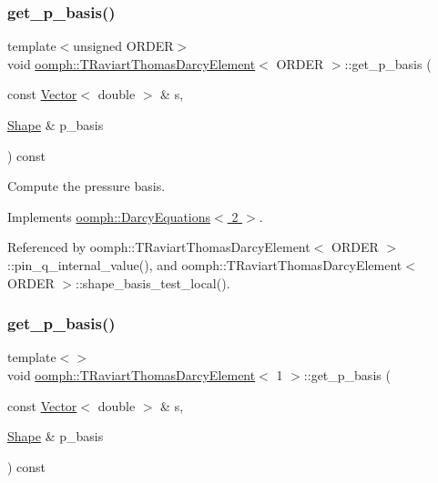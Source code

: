 \subsubsection{\texorpdfstring{get\+\_\+p\+\_\+basis()}{get\_p\_basis()}\hspace{0.1cm}{\footnotesize\ttfamily [2/3]}}
{\footnotesize\ttfamily template$<$unsigned O\+R\+D\+ER$>$ \\
void \hyperlink{classoomph_1_1TRaviartThomasDarcyElement}{oomph\+::\+T\+Raviart\+Thomas\+Darcy\+Element}$<$ O\+R\+D\+ER $>$\+::get\+\_\+p\+\_\+basis (\begin{DoxyParamCaption}\item[{const \hyperlink{classoomph_1_1Vector}{Vector}$<$ double $>$ \&}]{s,  }\item[{\hyperlink{classoomph_1_1Shape}{Shape} \&}]{p\+\_\+basis }\end{DoxyParamCaption}) const\hspace{0.3cm}{\ttfamily [virtual]}}



Compute the pressure basis. 



Implements \hyperlink{classoomph_1_1DarcyEquations_ab413b560166194e4a9d1b7de4742c5c0}{oomph\+::\+Darcy\+Equations$<$ 2 $>$}.



Referenced by oomph\+::\+T\+Raviart\+Thomas\+Darcy\+Element$<$ O\+R\+D\+E\+R $>$\+::pin\+\_\+q\+\_\+internal\+\_\+value(), and oomph\+::\+T\+Raviart\+Thomas\+Darcy\+Element$<$ O\+R\+D\+E\+R $>$\+::shape\+\_\+basis\+\_\+test\+\_\+local().

\mbox{\label{classoomph_1_1TRaviartThomasDarcyElement_a745f700fb01e94a3ccfb75faeb2f22c2}} 
\subsubsection{\texorpdfstring{get\+\_\+p\+\_\+basis()}{get\_p\_basis()}\hspace{0.1cm}{\footnotesize\ttfamily [3/3]}}
{\footnotesize\ttfamily template$<$$>$ \\
void \hyperlink{classoomph_1_1TRaviartThomasDarcyElement}{oomph\+::\+T\+Raviart\+Thomas\+Darcy\+Element}$<$ 1 $>$\+::get\+\_\+p\+\_\+basis (\begin{DoxyParamCaption}\item[{const \hyperlink{classoomph_1_1Vector}{Vector}$<$ double $>$ \&}]{s,  }\item[{\hyperlink{classoomph_1_1Shape}{Shape} \&}]{p\+\_\+basis }\end{DoxyParamCaption}) const\hspace{0.3cm}{\ttfamily [virtual]}}



